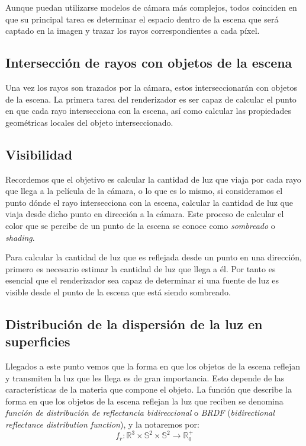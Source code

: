 Aunque puedan utilizarse modelos de cámara más complejos, todos coinciden en que su principal tarea es determinar el espacio dentro de la escena que será captado en la imagen y trazar los rayos correspondientes a cada píxel.

\subsection{Intersección de rayos con objetos de la escena}

Una vez los rayos son trazados por la cámara, estos interseccionarán con objetos de la escena. La primera tarea del renderizador es ser capaz de calcular el punto en que cada rayo intersecciona con la escena, así como calcular las propiedades geométricas locales del objeto interseccionado.

\subsection{Visibilidad}

Recordemos que el objetivo es calcular la cantidad de luz que viaja por cada rayo que llega a la película de la cámara, o lo que es lo mismo, si consideramos el punto dónde el rayo intersecciona con la escena, calcular la cantidad de luz que viaja desde dicho punto en dirección a la cámara. Este proceso de calcular el color que se percibe de un punto de la escena se conoce como \emph{sombreado} o \emph{shading}.

Para calcular la cantidad de luz que es reflejada desde un punto en una dirección, primero es necesario estimar la cantidad de luz que llega a él. Por tanto es esencial que el renderizador sea capaz de determinar si una fuente de luz es visible desde el punto de la escena que está siendo sombreado.

\subsection{Distribución de la dispersión de la luz en superficies}

Llegados a este punto vemos que la forma en que los objetos de la escena reflejan y transmiten la luz que les llega es de gran importancia. Esto depende de las características de la materia que compone el objeto. La función que describe la forma en que los objetos de la escena reflejan la luz que reciben se denomina \emph{función de distribución de reflectancia bidireccional} o \emph{BRDF} (\emph{bidirectional reflectance distribution function}), y la notaremos por:
$$f_r:\mathds{R}^3\times \mathds{S}^2 \times \mathds{S}^2 \rightarrow \mathds{R}^+_0$$

